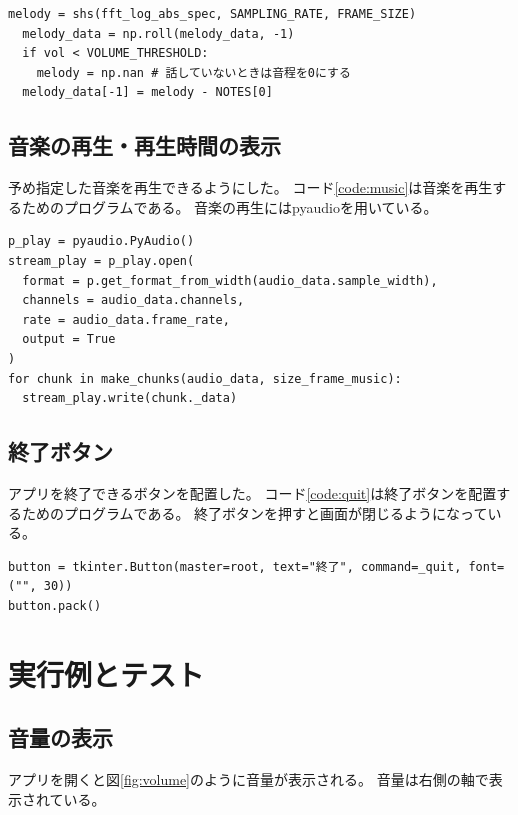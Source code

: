 \documentclass[a4paper,11pt]{jsarticle}
\begin{document}
\begin{lstlisting}[caption=音程の表示,label=code:note]
melody = shs(fft_log_abs_spec, SAMPLING_RATE, FRAME_SIZE)
  melody_data = np.roll(melody_data, -1)
  if vol < VOLUME_THRESHOLD:
    melody = np.nan # 話していないときは音程を0にする
  melody_data[-1] = melody - NOTES[0]
\end{lstlisting}


\subsection{音楽の再生・再生時間の表示}
予め指定した音楽を再生できるようにした。
コード\ref{code:music}は音楽を再生するためのプログラムである。
音楽の再生にはpyaudioを用いている。

\begin{lstlisting}[caption=音楽の再生,label=code:music]
p_play = pyaudio.PyAudio()
stream_play = p_play.open(
  format = p.get_format_from_width(audio_data.sample_width),	
  channels = audio_data.channels,								
  rate = audio_data.frame_rate,								
  output = True												
)
for chunk in make_chunks(audio_data, size_frame_music):
  stream_play.write(chunk._data)
\end{lstlisting}

\subsection{終了ボタン}
アプリを終了できるボタンを配置した。
コード\ref{code:quit}は終了ボタンを配置するためのプログラムである。
終了ボタンを押すと画面が閉じるようになっている。

\begin{lstlisting}[caption=終了ボタン,label=code:quit]
button = tkinter.Button(master=root, text="終了", command=_quit, font=("", 30))
button.pack()
\end{lstlisting}

\section{実行例とテスト}
\subsection{音量の表示}
アプリを開くと図\ref{fig:volume}のように音量が表示される。
音量は右側の軸で表示されている。
\end{document}
